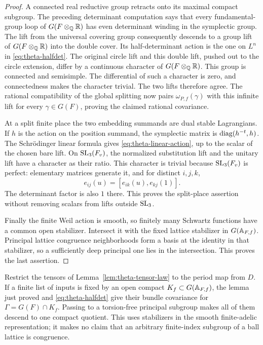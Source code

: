 \begin{proof}
A connected real reductive group retracts onto its maximal compact
subgroup.  The preceding determinant computation says that every
fundamental-group loop of \(G(F\otimes_{\mathbb{Q}}\mathbb{R})\) has even
determinant winding in the symplectic group.  The lift from the
universal covering group consequently descends to a group lift
of \(G(F\otimes_{\mathbb{Q}}\mathbb{R})\) into the double cover.  Its
half-determinant action is the one on \(L^n\) in
\eqref{eq:theta-halfdet}.  The original circle lift and this
double lift, pushed out to the circle extension, differ by a
continuous character of \(G(F\otimes_{\mathbb{Q}}\mathbb{R})\).  This group is
connected and semisimple.  The differential of such a character
is zero, and connectedness makes the character trivial.
The two lifts therefore agree.  The rational compatibility of
the global splitting now pairs \(\omega_{P,f}(\gamma)\) with
this infinite lift for every \(\gamma\in G(F)\), proving the
claimed rational covariance.

At a split finite place the two embedding summands are dual
stable Lagrangians.  If \(h\) is the action on the position
summand, the symplectic matrix is \(\operatorname{diag}(h^{-t},h)\).
The Schr\"odinger linear formula gives
\eqref{eq:theta-linear-action}, up to the scalar of the chosen
bare lift.  On \(\operatorname{SL}_3(F_v)\), the normalized substitution lift
and the unitary lift have a character as their ratio.  This
character is trivial because \(\operatorname{SL}_3(F_v)\) is perfect:
elementary matrices generate it, and for distinct \(i,j,k\),
\[
 e_{ij}(u)=[e_{ik}(u),e_{kj}(1)].
\]
The determinant factor is also \(1\) there.  This proves the
split-place assertion without removing scalars from lifts outside
\(\operatorname{SL}_3\).

Finally the finite Weil action is smooth, so finitely many
Schwartz functions have a common open stabilizer.  Intersect it
with the fixed lattice stabilizer in \(G(\mathbb{A}_{F,f})\).
Principal lattice congruence neighborhoods form a basis at the
identity in that stabilizer, so a sufficiently deep principal
one lies in the intersection.  This proves the last assertion.
\end{proof}

Restrict the tensors of Lemma~\ref{lem:theta-tensor-law} to the
period map from \(D\).  If a finite list of inputs is fixed by an
open compact \(K_f\subset G(\mathbb{A}_{F,f})\), the lemma just proved
and \eqref{eq:theta-halfdet} give their bundle covariance for
\(\Gamma=G(F)\cap K_f\).  Passing to a torsion-free principal
subgroup makes all of them descend to one compact quotient.
This uses stabilizers in the smooth finite-adelic representation;
it makes no claim that an arbitrary finite-index subgroup of a
ball lattice is congruence.

